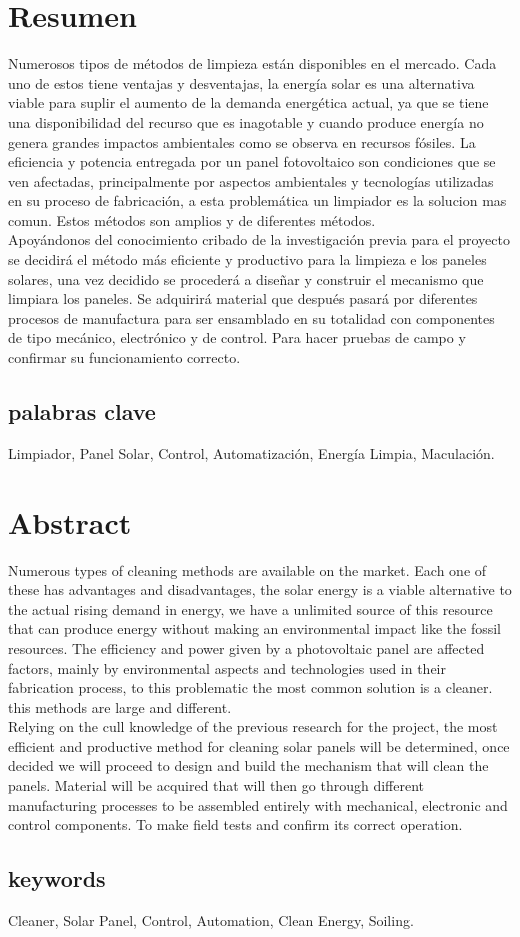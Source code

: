 {
\section*{Resumen}\label{resumen}
\thispagestyle{empty}
\let\clearpage\relax
Numerosos tipos de métodos de limpieza están disponibles en el mercado. Cada uno de estos tiene ventajas y desventajas, la energía solar es una alternativa viable para suplir el aumento de la demanda energética actual, ya que se tiene una disponibilidad del recurso que es inagotable y cuando produce energía no genera grandes impactos ambientales como se observa en recursos fósiles. La eficiencia y potencia entregada por un panel fotovoltaico son condiciones que se ven afectadas, principalmente por aspectos ambientales y tecnologías utilizadas en su proceso de fabricación, a esta problemática un limpiador es la solucion mas comun. Estos métodos son amplios y de diferentes métodos.\\
Apoyándonos del conocimiento cribado de la investigación previa para el proyecto se decidirá el método más eficiente y productivo para la limpieza e los paneles solares, una vez decidido se procederá a diseñar y construir el mecanismo que limpiara los paneles. Se adquirirá material que después pasará por diferentes procesos de manufactura para ser ensamblado en su totalidad con componentes de tipo mecánico, electrónico y de control. Para hacer pruebas de campo y confirmar su funcionamiento correcto.


\subsection*{palabras clave}\label{palabras}
Limpiador, Panel Solar, Control, Automatización, Energía Limpia, Maculación.
\newpage
\section*{Abstract}\label{abstract}
Numerous types of cleaning methods are available on the market. Each one of these has advantages and disadvantages, the solar energy is a viable alternative to the actual rising demand in energy,  we have a unlimited source of this resource that can produce energy without making an environmental impact like the fossil resources. The efficiency and power given by a photovoltaic panel are affected factors, mainly by environmental aspects  and  technologies used in their fabrication process, to this problematic the most common solution is a cleaner. this methods are large and different. \\
Relying on the cull knowledge of the previous research for the project, the most efficient and productive method for cleaning solar panels will be determined, once decided we will proceed to design and build the mechanism that will clean the panels. Material will be acquired that will then go through different manufacturing processes to be assembled entirely with mechanical, electronic and control components. To make field tests and confirm its correct operation.

\subsection*{keywords}\label{keywords}
Cleaner, Solar Panel, Control, Automation, Clean Energy, Soiling.
}